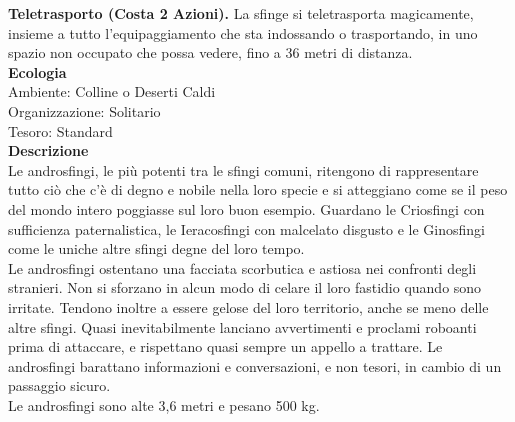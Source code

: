 \begin{multicols}{2}
\textbf{Teletrasporto (Costa 2 Azioni).} La sfinge si teletrasporta magicamente, insieme a tutto l'equipaggiamento che sta indossando o trasportando, in uno spazio non occupato che possa vedere, fino a 36 metri di distanza.\\
\textbf{Ecologia}\\
Ambiente: Colline o Deserti Caldi\\
Organizzazione: Solitario\\
Tesoro: Standard\\
\textbf{Descrizione}\\
Le androsfingi, le più potenti tra le sfingi comuni, ritengono di rappresentare tutto ciò che c'è di degno e nobile nella loro specie e si atteggiano come se il peso del mondo intero poggiasse sul loro buon esempio. Guardano le Criosfingi con sufficienza paternalistica, le Ieracosfingi con malcelato disgusto e le Ginosfingi come le uniche altre sfingi degne del loro tempo.\\

Le androsfingi ostentano una facciata scorbutica e astiosa nei confronti degli stranieri. Non si sforzano in alcun modo di celare il loro fastidio quando sono irritate. Tendono inoltre a essere gelose del loro territorio, anche se meno delle altre sfingi. Quasi inevitabilmente lanciano avvertimenti e proclami roboanti prima di attaccare, e rispettano quasi sempre un appello a trattare. Le androsfingi barattano informazioni e conversazioni, e non tesori, in cambio di un passaggio sicuro.\\
Le androsfingi sono alte 3,6 metri e pesano 500 kg.\\



\end{multicols}
